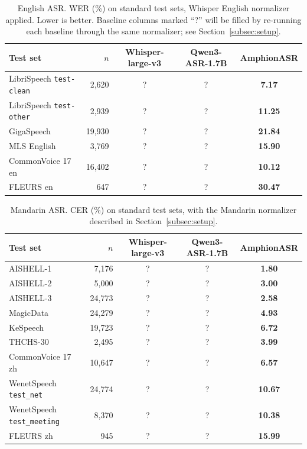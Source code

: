 \begin{table}[t]
  \caption{English ASR. WER (\%) on standard test sets, Whisper English
    normalizer applied. Lower is better. Baseline columns marked ``?''
    will be filled by re-running each baseline through the same
    normalizer; see Section~\ref{subsec:setup}.}
  \label{tab:asr_en}
  \centering
  \small
  \begin{tabular}{lrccc}
    \toprule
    Test set & $n$ & Whisper-large-v3 & Qwen3-ASR-1.7B & \textbf{AmphionASR} \\
    \midrule
    LibriSpeech \texttt{test-clean}   & 2{,}620  & ? & ? & \textbf{7.17} \\
    LibriSpeech \texttt{test-other}   & 2{,}939  & ? & ? & \textbf{11.25} \\
    GigaSpeech                        & 19{,}930 & ? & ? & \textbf{21.84} \\
    MLS English                       & 3{,}769  & ? & ? & \textbf{15.90} \\
    CommonVoice 17 en                 & 16{,}402 & ? & ? & \textbf{10.12} \\
    FLEURS en                         & 647      & ? & ? & \textbf{30.47} \\
    \bottomrule
  \end{tabular}
\end{table}

\begin{table}[t]
  \caption{Mandarin ASR. CER (\%) on standard test sets, with the
    Mandarin normalizer described in Section~\ref{subsec:setup}.}
  \label{tab:asr_zh}
  \centering
  \small
  \begin{tabular}{lrccc}
    \toprule
    Test set & $n$ & Whisper-large-v3 & Qwen3-ASR-1.7B & \textbf{AmphionASR} \\
    \midrule
    AISHELL-1                          & 7{,}176  & ? & ? & \textbf{1.80} \\
    AISHELL-2                          & 5{,}000  & ? & ? & \textbf{3.00} \\
    AISHELL-3                          & 24{,}773 & ? & ? & \textbf{2.58} \\
    MagicData                          & 24{,}279 & ? & ? & \textbf{4.93} \\
    KeSpeech                           & 19{,}723 & ? & ? & \textbf{6.72} \\
    THCHS-30                           & 2{,}495  & ? & ? & \textbf{3.99} \\
    CommonVoice 17 zh                  & 10{,}647 & ? & ? & \textbf{6.57} \\
    WenetSpeech \texttt{test\_net}     & 24{,}774 & ? & ? & \textbf{10.67} \\
    WenetSpeech \texttt{test\_meeting} & 8{,}370  & ? & ? & \textbf{10.38} \\
    FLEURS zh                          & 945      & ? & ? & \textbf{15.99} \\
    \bottomrule
  \end{tabular}
\end{table}

